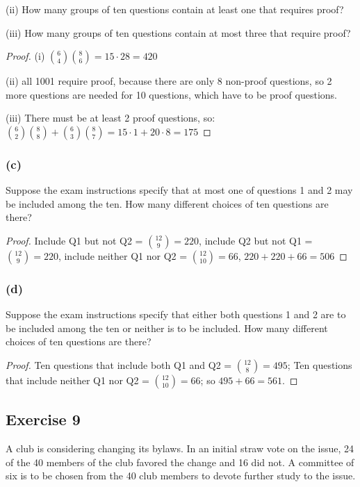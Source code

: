 \documentclass[14pt]{extarticle}
\begin{document}
(ii) How many groups of ten questions contain at least one that requires proof?

(iii) How many groups of ten questions contain at most three that require proof?

\begin{proof}
     (i) \(\binom{6}{4} \binom{8}{6} = 15 \cdot 28 = 420\)

     (ii) all 1001 require proof, because there are only 8 non-proof questions, so 2 more questions are needed for 10
     questions, which have to be proof questions.

     (iii) There must be at least 2 proof questions, so: \(\binom{6}{2}\binom{8}{8} + \binom{6}{3}\binom{8}{7} =
     15 \cdot 1 + 20 \cdot 8 = 175\)
\end{proof}

\subsubsection{(c)}
Suppose the exam instructions specify that at most one of questions 1 and 2 may be included among the ten. How many
different choices of ten questions are there?

\begin{proof}
     Include Q1 but not Q2 = \(\binom{12}{9} = 220\),
     include Q2 but not Q1 = \(\binom{12}{9} = 220\),
     include neither Q1 nor Q2 = \(\binom{12}{10} = 66\),
     \(220 + 220 + 66 = 506\)
\end{proof}

\subsubsection{(d)}
Suppose the exam instructions specify that either both questions 1 and 2 are to be included among the ten or
neither is to be included. How many different choices of ten questions are there?

\begin{proof}
     Ten questions that include both Q1 and Q2 = \(\binom{12}{8} = 495\); Ten questions that include neither Q1 nor Q2 =
     \(\binom{12}{10} = 66\); so \(495 + 66 = 561\).
\end{proof}

\subsection{Exercise 9}
A club is considering changing its bylaws. In an initial straw vote on the issue, 24 of the 40 members of the club
favored the change and 16 did not. A committee of six is to be chosen from the 40 club members to devote further study
to the issue.
\end{document}
